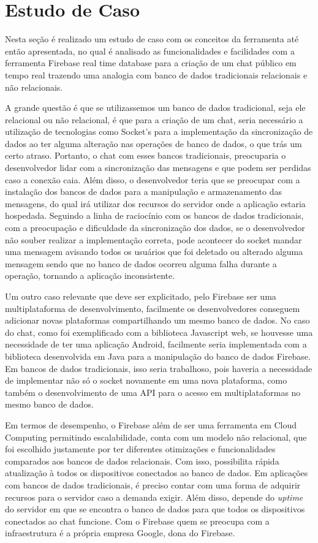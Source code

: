 \documentclass[12pt]{article}
\begin{document}
\section{Estudo de Caso}

Nesta seção é realizado um estudo de caso com os conceitos da ferramenta até então apresentada, no qual é analisado as funcionalidades e facilidades com a ferramenta Firebase real time database para a criação de um chat público em tempo real trazendo uma analogia com banco de dados tradicionais relacionais e não relacionais.

A grande questão é que se utilizassemos um banco de dados tradicional, seja ele relacional ou não relacional, é que para a criação de um chat, seria necessário a utilização de tecnologias como Socket's para a implementação da sincronização de dados ao ter alguma alteração nas operações de banco de dados, o que trás um certo atraso. Portanto, o chat com esses bancos tradicionais, preocuparia o desenvolvedor lidar com a sincronização das mensagens e que podem ser perdidas caso a conexão caia. Além disso, o desenvolvedor teria que se preocupar com a instalação dos bancos de dados para a manipulação e armazenamento das mensagens, do qual irá utilizar dos recursos do servidor onde a aplicação estaria hospedada. Seguindo a linha de raciocínio com os bancos de dados tradicionais, com a preocupação e dificuldade da sincronização dos dados, se o desenvolvedor não souber realizar a implementação correta, pode acontecer do socket mandar uma mensagem avisando todos os usuários que foi deletado ou alterado alguma mensagem sendo que no banco de dados ocorreu alguma falha durante a operação, tornando a aplicação inconsistente.

Um outro caso relevante que deve ser explicitado, pelo Firebase ser uma multiplataforma de desenvolvimento, facilmente os desenvolvedores conseguem adicionar novas plataformas compartilhando um mesmo banco de dados. No caso do chat, como foi exemplificado com a biblioteca Javascript web, se houvesse uma necessidade de ter uma aplicação Android, facilmente seria implementada com a biblioteca desenvolvida em Java para a manipulação do banco de dados Firebase. Em bancos de dados tradicionais, isso seria trabalhoso, pois haveria a necessidade de implementar não só o socket novamente em uma nova plataforma, como também o desenvolvimento de uma API para o acesso em multiplataformas no mesmo banco de dados.

Em termos de desempenho, o Firebase além de ser uma ferramenta em Cloud Computing permitindo escalabilidade, conta com um modelo não relacional, que foi escolhido justamente por ter diferentes otimizações e funcionalidades comparados aos bancos de dados relacionais. Com isso, possibilita rápida atualização à todos os dispositivos conectados ao banco de dados. Em aplicações com bancos de dados tradicionais, é preciso contar com uma forma de adquirir recursos para o servidor caso a demanda exigir. Além disso, depende do \textit{uptime} do servidor em que se encontra o banco de dados para que todos os dispositivos conectados ao chat funcione. Com o Firebase quem se preocupa com a infraestrutura é a própria empresa Google, dona do Firebase.
\end{document}
